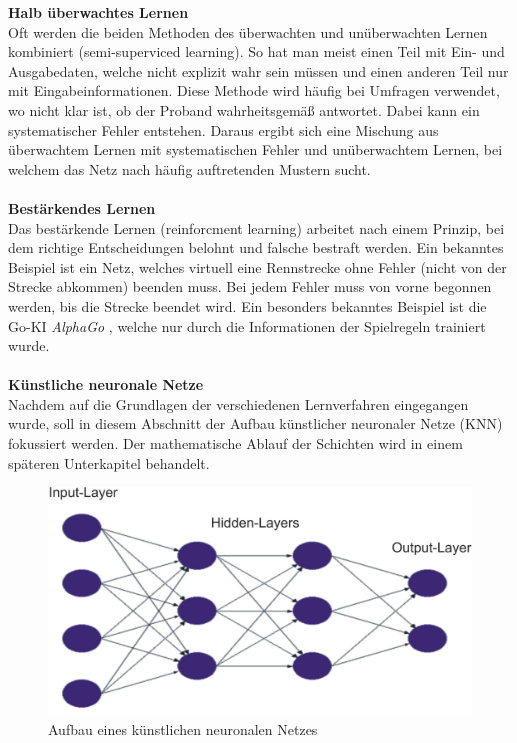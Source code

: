 \textbf{Halb überwachtes Lernen}\\
Oft werden die beiden Methoden des überwachten und unüberwachten Lernen kombiniert (semi-superviced learning). So hat man meist einen Teil mit Ein- und Ausgabedaten, welche nicht explizit wahr sein müssen und einen anderen Teil nur mit Eingabeinformationen. Diese Methode wird häufig bei Umfragen verwendet, wo nicht klar ist, ob der Proband wahrheitsgemäß antwortet. Dabei kann ein systematischer Fehler entstehen. Daraus ergibt sich eine Mischung aus überwachtem Lernen mit systematischen Fehler und unüberwachtem Lernen, bei welchem das Netz nach häufig auftretenden Mustern sucht.\\\\
\textbf{Bestärkendes Lernen}\\ 
Das bestärkende Lernen (reinforcment learning) arbeitet nach einem Prinzip, bei dem richtige Entscheidungen belohnt und falsche bestraft werden. Ein bekanntes Beispiel ist ein Netz, welches virtuell eine Rennstrecke ohne Fehler (nicht von der Strecke abkommen) beenden muss. Bei jedem Fehler muss von vorne begonnen werden, bis die Strecke beendet wird. Ein besonders bekanntes Beispiel ist die Go-KI \textit{AlphaGo} \cite{Alpha2016GO}, welche nur durch die Informationen der Spielregeln trainiert wurde.\\\\
\textbf{Künstliche neuronale Netze}\\
Nachdem auf die Grundlagen der verschiedenen Lernverfahren eingegangen wurde, soll in diesem Abschnitt der Aufbau künstlicher neuronaler Netze (KNN) fokussiert werden. Der mathematische Ablauf der Schichten wird in einem späteren Unterkapitel behandelt.
\begin{figure}
	[h]
	\centering
	\includegraphics[scale=0.5]{Sources/nnet.png}
	\caption{Aufbau eines künstlichen neuronalen Netzes \cite{bistra2018pic}}
	\label{img:neuronales_netz}
\end{figure}
